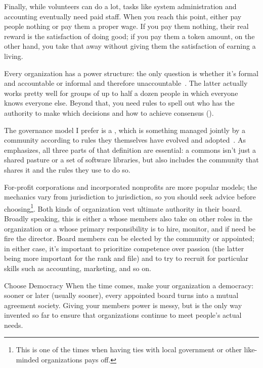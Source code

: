 Finally, 
while volunteers can do a lot,
tasks like system administration and accounting eventually need paid staff.
When you reach this point,
either pay people nothing or pay them a proper wage.
If you pay them nothing,
their real reward is the satisfaction of doing good;
if you pay them a token amount,
on the other hand,
you take that away without giving them the satisfaction of earning a living.


Every organization has a power structure:
the only question is
whether it's formal and accountable or informal and therefore unaccountable~\cite{Free1972}.
The latter actually works pretty well for groups of up to half a dozen people
in which everyone knows everyone else.
Beyond that,
you need rules to spell out
who has the authority to make which decisions
and how to achieve consensus ().

The governance model I prefer is a ,
which is something managed jointly by a community
according to rules they themselves have evolved and adopted~\cite{Ostr2015}.
As~\cite{Boll2014} emphasizes,
all three parts of that definition are essential:
a commons isn't just a shared pasture or a set of software libraries,
but also includes the community that shares it
and the rules they use to do so.

For-profit corporations and incorporated nonprofits are more popular models;
the mechanics vary from jurisdiction to jurisdiction,
so you should seek advice before choosing\footnote{
  This is one of the times when
  having ties with local government or other like-minded organizations pays off.}.
Both kinds of organization vest ultimate authority in their board.
Broadly speaking, this is either a 
whose members also take on other roles in the organization
or a  whose primary responsibility is to hire, monitor,
and if need be fire the director.
Board members can be elected by the community or appointed;
in either case,
it's important to prioritize competence over passion
(the latter being more important for the rank and file)
and to try to recruit for particular skills such as accounting, marketing, and so on.

\begin{aside}{Choose Democracy}
  When the time comes,
  make your organization a democracy:
  sooner or later (usually sooner),
  every appointed board turns into a mutual agreement society.
  Giving your members power is messy,
  but is the only way invented so far to ensure that
  organizations continue to meet people's actual needs.
\end{aside}


